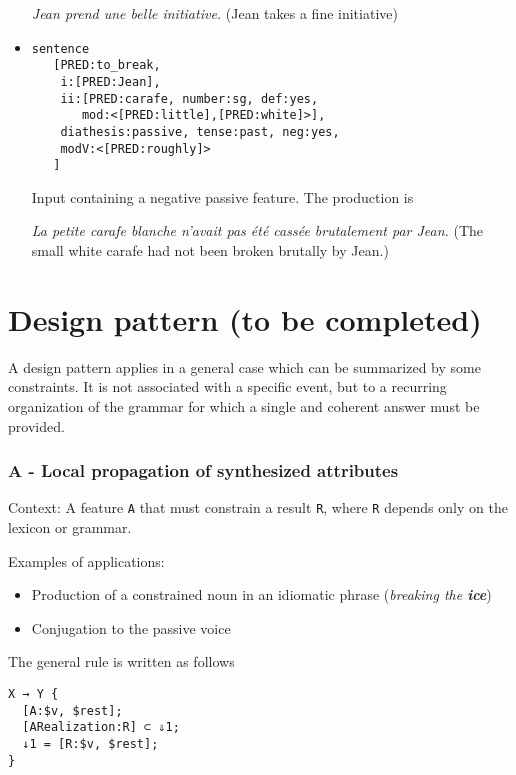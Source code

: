 \documentclass[11pt]{article}
\begin{document}
\begin{itemize}
\begin{exe}
\ex \textit{Jean prend une belle initiative.}  (Jean takes a fine initiative)
\end{exe}

\item 
\begin{verbatim}
sentence 
   [PRED:to_break,
    i:[PRED:Jean], 
    ii:[PRED:carafe, number:sg, def:yes, 
       mod:<[PRED:little],[PRED:white]>], 
    diathesis:passive, tense:past, neg:yes, 
    modV:<[PRED:roughly]>
   ]
\end{verbatim}

Input containing a negative passive feature. The
production is
\begin{exe}
\ex \textit{La petite carafe blanche n'avait pas été cassée
brutalement par Jean.} (The small white carafe had not been broken
brutally by Jean.)
\end{exe}

\end{itemize}

\section{Design pattern (to be completed)}

A design pattern applies in a general case which can be summarized by
some constraints. It is not associated with a specific event, but to a
recurring organization of the grammar for which a single and coherent
answer must be provided.


\subsubsection*{A - Local propagation of synthesized attributes}

Context:
A feature \texttt{A} that must constrain a result \texttt{R}, where
\texttt{R} depends only on the lexicon or grammar.

Examples of applications:
\begin{itemize}
\item Production of a constrained noun in an idiomatic phrase (\textit{breaking the \textbf{ice}})
\item Conjugation to the passive voice
\end{itemize}

The general rule is written as follows

\begin{lstlisting}
X → Y {
  [A:$v, $rest];
  [ARealization:R] ⊂ ⇓1;
  ↓1 = [R:$v, $rest];
}
\end{lstlisting}
\end{document}
